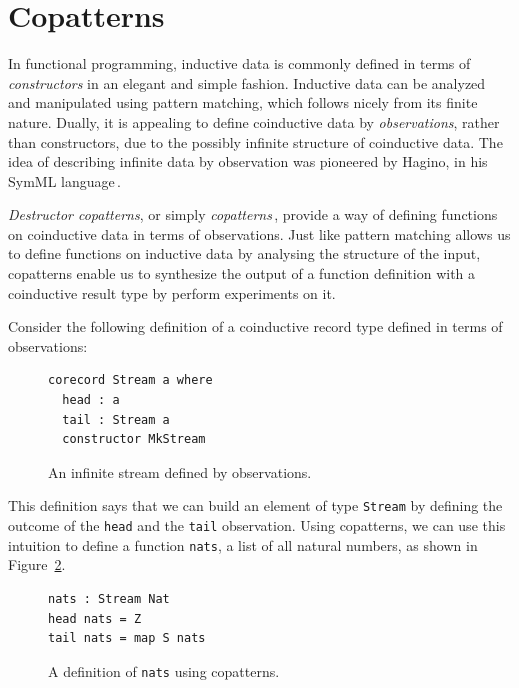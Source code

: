 

\section{Copatterns}
\label{sec:copatterns}
In functional programming, inductive data is commonly defined in terms of \emph{constructors} in an
elegant and simple fashion. Inductive data can be analyzed and manipulated using
pattern matching, which follows nicely from its finite nature. Dually, it is appealing to define coinductive data by
\emph{observations}, rather than constructors, due to the possibly infinite
structure of coinductive data. The idea of describing infinite data by
observation was pioneered by Hagino, in his SymML language\,\citep{Hagino89}.

\emph{Destructor copatterns}, or simply
\emph{copatterns}\,\citep{Abel13Copatterns}, provide a way of defining functions
on coinductive data in terms of observations. Just like pattern matching allows us to
define functions on inductive data by analysing the structure of the input,
copatterns enable us to synthesize the output of a function definition with a
coinductive result type by perform experiments on it.

Consider the following definition of a coinductive record type defined in terms
of observations:

\begin{figure}[h]
\begin{lstlisting}[mathescape]
corecord Stream a where
  head : a
  tail : Stream a 
  constructor MkStream
\end{lstlisting}
\caption{An infinite stream defined by observations.}
\label{fig:stream}
\end{figure}

This definition says that we can build an element of type \texttt{Stream} by
defining the outcome of the \texttt{head} and the \texttt{tail}
observation. Using copatterns, we can use this intuition to define a function
\texttt{nats}, a list of all natural numbers, as shown in
Figure~\ref{fig:nats_copatterns}.

\begin{figure}[h]
\begin{lstlisting}[mathescape]
nats : Stream Nat
head nats = Z
tail nats = map S nats
\end{lstlisting}
\caption{A definition of \texttt{nats} using copatterns.}
\label{fig:nats_copatterns}
\end{figure}

